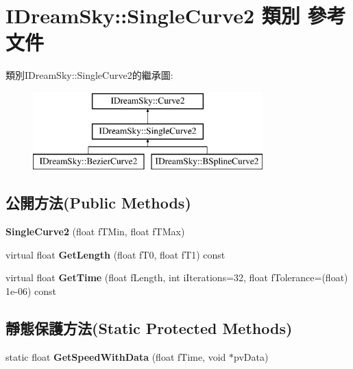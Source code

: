 \hypertarget{class_i_dream_sky_1_1_single_curve2}{}\section{I\+Dream\+Sky\+:\+:Single\+Curve2 類別 參考文件}
\label{class_i_dream_sky_1_1_single_curve2}
類別\+I\+Dream\+Sky\+:\+:Single\+Curve2的繼承圖\+:\begin{figure}[H]
\begin{center}
\leavevmode
\includegraphics[height=3.000000cm]{class_i_dream_sky_1_1_single_curve2}
\end{center}
\end{figure}
\subsection*{公開方法(Public Methods)}
\begin{DoxyCompactItemize}
\item 
{\bfseries Single\+Curve2} (float f\+T\+Min, float f\+T\+Max)\hypertarget{class_i_dream_sky_1_1_single_curve2_a6b98b9a2f752159e677c0470999c9dd0}{}\label{class_i_dream_sky_1_1_single_curve2_a6b98b9a2f752159e677c0470999c9dd0}

\item 
virtual float {\bfseries Get\+Length} (float f\+T0, float f\+T1) const \hypertarget{class_i_dream_sky_1_1_single_curve2_a6d60aa48912a23b5780f5059ca6dbcb5}{}\label{class_i_dream_sky_1_1_single_curve2_a6d60aa48912a23b5780f5059ca6dbcb5}

\item 
virtual float {\bfseries Get\+Time} (float f\+Length, int i\+Iterations=32, float f\+Tolerance=(float) 1e-\/06) const \hypertarget{class_i_dream_sky_1_1_single_curve2_a9708bda255b224d84f3bca2a80a14186}{}\label{class_i_dream_sky_1_1_single_curve2_a9708bda255b224d84f3bca2a80a14186}

\end{DoxyCompactItemize}
\subsection*{靜態保護方法(Static Protected Methods)}
\begin{DoxyCompactItemize}
\item 
static float {\bfseries Get\+Speed\+With\+Data} (float f\+Time, void $\ast$pv\+Data)\hypertarget{class_i_dream_sky_1_1_single_curve2_a818e9bc9d3bc3edbefc15f6dcaf2c0a4}{}\label{class_i_dream_sky_1_1_single_curve2_a818e9bc9d3bc3edbefc15f6dcaf2c0a4}

\end{DoxyCompactItemize}
